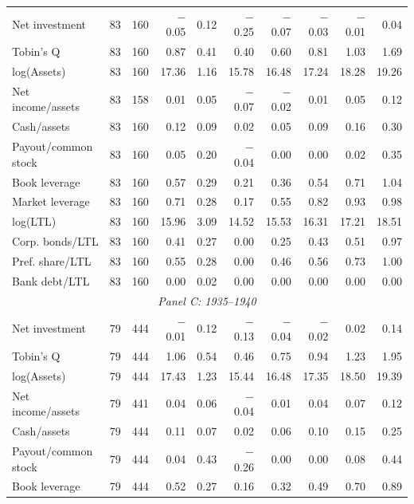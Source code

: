 \begin{table}[p]
\begin{threeparttable}
\begin{tabular}{lrrrrrrrrr}
            \midrule
            Net investment & 83 & 160 & $-$0.05 & 0.12 & $-$0.25 & $-$0.07 & $-$0.03 & $-$0.01 & 0.04 \\
            Tobin's Q & 83 & 160 & 0.87 & 0.41 & 0.40 & 0.60 & 0.81 & 1.03 & 1.69 \\
            log(Assets) & 83 & 160 & 17.36 & 1.16 & 15.78 & 16.48 & 17.24 & 18.28 & 19.26 \\
            Net income/assets & 83 & 158 & 0.01 & 0.05 & $-$0.07 & $-$0.02 & 0.01 & 0.05 & 0.12 \\
            Cash/assets & 83 & 160 & 0.12 & 0.09 & 0.02 & 0.05 & 0.09 & 0.16 & 0.30 \\
            Payout/common stock & 83 & 160 & 0.05 & 0.20 & $-$0.04 & 0.00 & 0.00 & 0.02 & 0.35 \\
            Book leverage & 83 & 160 & 0.57 & 0.29 & 0.21 & 0.36 & 0.54 & 0.71 & 1.04 \\
            Market leverage & 83 & 160 & 0.71 & 0.28 & 0.17 & 0.55 & 0.82 & 0.93 & 0.98 \\
            log(LTL) & 83 & 160 & 15.96 & 3.09 & 14.52 & 15.53 & 16.31 & 17.21 & 18.51 \\
            Corp. bonds/LTL & 83 & 160 & 0.41 & 0.27 & 0.00 & 0.25 & 0.43 & 0.51 & 0.97 \\
            Pref. share/LTL & 83 & 160 & 0.55 & 0.28 & 0.00 & 0.46 & 0.56 & 0.73 & 1.00 \\
            Bank debt/LTL & 83 & 160 & 0.00 & 0.02 & 0.00 & 0.00 & 0.00 & 0.00 & 0.00 \\
            \midrule
            \multicolumn{10}{c}{\textit{Panel C: 1935--1940}} \\
            \midrule
            Net investment & 79 & 444 & $-$0.01 & 0.12 & $-$0.13 & $-$0.04 & $-$0.02 & 0.02 & 0.14 \\
            Tobin's Q & 79 & 444 & 1.06 & 0.54 & 0.46 & 0.75 & 0.94 & 1.23 & 1.95 \\
            log(Assets) & 79 & 444 & 17.43 & 1.23 & 15.44 & 16.48 & 17.35 & 18.50 & 19.39 \\
            Net income/assets & 79 & 441 & 0.04 & 0.06 & $-$0.04 & 0.01 & 0.04 & 0.07 & 0.12 \\
            Cash/assets & 79 & 444 & 0.11 & 0.07 & 0.02 & 0.06 & 0.10 & 0.15 & 0.25 \\
            Payout/common stock & 79 & 444 & 0.04 & 0.43 & $-$0.26 & 0.00 & 0.00 & 0.08 & 0.44 \\
            Book leverage & 79 & 444 & 0.52 & 0.27 & 0.16 & 0.32 & 0.49 & 0.70 & 0.89 \\

\end{tabular}
\end{threeparttable}
\end{table}

